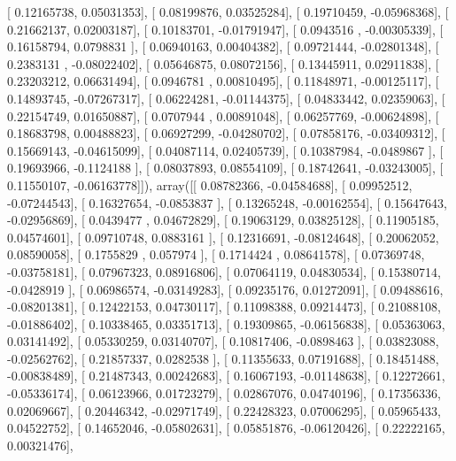 \documentclass{article}
\begin{document}
       [ 0.12165738,  0.05031353],
       [ 0.08199876,  0.03525284],
       [ 0.19710459, -0.05968368],
       [ 0.21662137,  0.02003187],
       [ 0.10183701, -0.01791947],
       [ 0.0943516 , -0.00305339],
       [ 0.16158794,  0.0798831 ],
       [ 0.06940163,  0.00404382],
       [ 0.09721444, -0.02801348],
       [ 0.2383131 , -0.08022402],
       [ 0.05646875,  0.08072156],
       [ 0.13445911,  0.02911838],
       [ 0.23203212,  0.06631494],
       [ 0.0946781 ,  0.00810495],
       [ 0.11848971, -0.00125117],
       [ 0.14893745, -0.07267317],
       [ 0.06224281, -0.01144375],
       [ 0.04833442,  0.02359063],
       [ 0.22154749,  0.01650887],
       [ 0.0707944 ,  0.00891048],
       [ 0.06257769, -0.00624898],
       [ 0.18683798,  0.00488823],
       [ 0.06927299, -0.04280702],
       [ 0.07858176, -0.03409312],
       [ 0.15669143, -0.04615099],
       [ 0.04087114,  0.02405739],
       [ 0.10387984, -0.0489867 ],
       [ 0.19693966, -0.1124188 ],
       [ 0.08037893,  0.08554109],
       [ 0.18742641, -0.03243005],
       [ 0.11550107, -0.06163778]]), array([[ 0.08782366, -0.04584688],
       [ 0.09952512, -0.07244543],
       [ 0.16327654, -0.0853837 ],
       [ 0.13265248, -0.00162554],
       [ 0.15647643, -0.02956869],
       [ 0.0439477 ,  0.04672829],
       [ 0.19063129,  0.03825128],
       [ 0.11905185,  0.04574601],
       [ 0.09710748,  0.0883161 ],
       [ 0.12316691, -0.08124648],
       [ 0.20062052,  0.08590058],
       [ 0.1755829 ,  0.057974  ],
       [ 0.1714424 ,  0.08641578],
       [ 0.07369748, -0.03758181],
       [ 0.07967323,  0.08916806],
       [ 0.07064119,  0.04830534],
       [ 0.15380714, -0.0428919 ],
       [ 0.06986574, -0.03149283],
       [ 0.09235176,  0.01272091],
       [ 0.09488616, -0.08201381],
       [ 0.12422153,  0.04730117],
       [ 0.11098388,  0.09214473],
       [ 0.21088108, -0.01886402],
       [ 0.10338465,  0.03351713],
       [ 0.19309865, -0.06156838],
       [ 0.05363063,  0.03141492],
       [ 0.05330259,  0.03140707],
       [ 0.10817406, -0.0898463 ],
       [ 0.03823088, -0.02562762],
       [ 0.21857337,  0.0282538 ],
       [ 0.11355633,  0.07191688],
       [ 0.18451488, -0.00838489],
       [ 0.21487343,  0.00242683],
       [ 0.16067193, -0.01148638],
       [ 0.12272661, -0.05336174],
       [ 0.06123966,  0.01723279],
       [ 0.02867076,  0.04740196],
       [ 0.17356336,  0.02069667],
       [ 0.20446342, -0.02971749],
       [ 0.22428323,  0.07006295],
       [ 0.05965433,  0.04522752],
       [ 0.14652046, -0.05802631],
       [ 0.05851876, -0.06120426],
       [ 0.22222165,  0.00321476],
\end{document}
